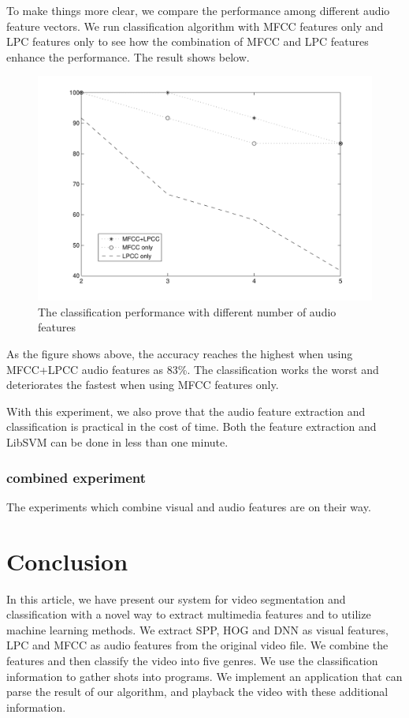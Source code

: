 \documentclass{article}
\begin{document}
  To make things more clear, we compare the performance among different audio feature vectors. We run classification algorithm with MFCC features only and LPC features only to see how the combination of MFCC and LPC features enhance the performance. The result shows below.
  
  \begin{figure}[H]
    \centering \includegraphics[width=\textwidth/2]{img/audio.pdf}
    \caption{The classification performance with different number of audio features}
  \end{figure}

  As the figure shows above, the accuracy reaches the highest when using MFCC+LPCC audio features as 83\%. The classification works the worst and deteriorates the fastest when using MFCC features only. 
  
  With this experiment, we also prove that the audio feature extraction and classification is practical in the cost of time. Both the feature extraction and LibSVM can be done in less than one minute.

\subsubsection{combined experiment}

The experiments which combine visual and audio features are on their way.

\section{Conclusion}

In this article, we have present our system for video segmentation and classification with a novel way to extract multimedia features and to utilize machine learning methods. We extract SPP, HOG and DNN as visual features, LPC and MFCC as audio features from the original video file. We combine the features and then classify the video into five genres. We use the classification information to gather shots into programs. We implement an application that can parse the result of our algorithm, and playback the video with these additional information.
\end{document}
